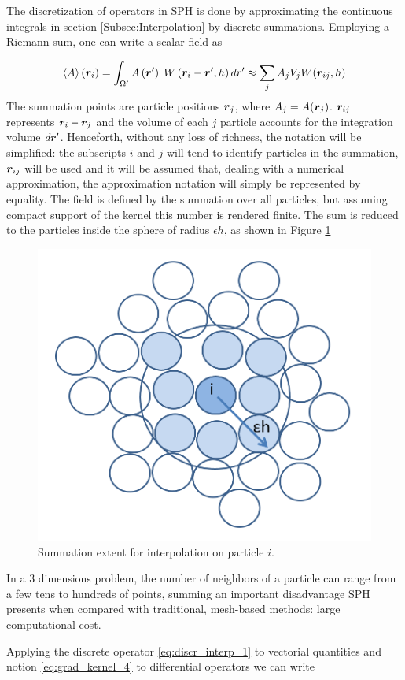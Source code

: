 The discretization of operators in \ac{SPH} is done by approximating the continuous integrals in section \ref{Subsec:Interpolation} by discrete summations. Employing a Riemann sum, one can write a scalar field as

% 
\begin{equation} \label{eq:discr_interp_1}
\left\langle {A} \right\rangle \left( {\boldsymbol{r}_i} \right) = \int_{\Omega '}  {A\left( {\boldsymbol{r}'} \right)\; W \left( {{\boldsymbol{r}_i} - {\boldsymbol{r}}', h} \right)d{{r}}'} \approx \sum_j{A_j V_j W(\boldsymbol{r}_{ij}, h)}
\end{equation}
%
The summation points are particle positions $\boldsymbol{r}_{j}$, where $A_j=A(\boldsymbol{r}_{j})$. $\boldsymbol{r}_{ij}$ represents $\boldsymbol{r}_{i}-\boldsymbol{r}_{j}$ and the volume of each $j$ particle accounts for the integration volume $d{\boldsymbol{r}}'$. Henceforth, without any loss of richness, the notation will be simplified: the subscripts $i$ and $j$ will tend to identify particles in the summation, $\boldsymbol{r}_{ij}$ will be used and it will be assumed that, dealing with a numerical approximation, the approximation notation will simply be represented by equality. The field is defined by the summation over all particles, but assuming compact support of the kernel this number is rendered finite. The sum is reduced to the particles inside the sphere of radius $\epsilon h$, as shown in Figure \ref{fig:kernel}

%
\begin{figure}[ht!]
	\centering 
	\includegraphics[width=0.40\linewidth]{Figures/3.Chapter/kernel}
	\caption{Summation extent for interpolation on particle $i$.}
	\label{fig:kernel} 
\end{figure}
%
In a 3 dimensions problem, the number of neighbors of a particle can range from a few tens to hundreds of points, summing an important disadvantage \ac{SPH} presents when compared with traditional, mesh-based methods: large computational cost.

Applying the discrete operator \eqref{eq:discr_interp_1} to vectorial quantities and notion \eqref{eq:grad_kernel_4} to differential operators we can write

